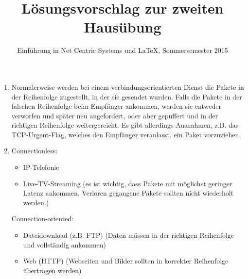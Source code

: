\documentclass[a4paper,
			llpt,
			solution,
			accentcolor=tud2d,
			colorbacktitle
			]
			{tudexercise}
\title{Lösungsvorschlag zur zweiten Hausübung}
\subtitle{Einführung in Net Centric Systems und \LaTeX, Sommersemester 2015}
\begin{document}
\maketitle

\setcounter{section}{2}
\subsection{}

\begin{enumerate}

\item
Normalerweise werden bei einem verbindungsorientierten Dienst die Pakete in der Reihenfolge zugestellt, in der sie gesendet wurden. Falls die Pakete in der falschen Reihenfolge beim Empfänger ankommen, werden sie entweder verworfen und später neu angefordert, oder aber gepuffert und in der richtigen Reihenfolge weitergereicht.
Es gibt allerdings Ausnahmen, z.B. das TCP-Urgent-Flag, welches den Empfänger veranlasst, ein Paket vorzuziehen.

\item
Connectionless:
\begin{itemize}
\item IP-Telefonie
\item Live-TV-Streaming
(es ist wichtig, dass Pakete mit möglichst geringer Latenz ankommen. Verloren gegangene Pakete sollten nicht wiederholt werden.)
\end{itemize}
Connection-oriented:
\begin{itemize}
\item Dateidownload (z.B. FTP)
(Daten müssen in der richtigen Reihenfolge und vollständig ankommen)
\item Web (HTTP)
(Webseiten und Bilder sollten in korrekter Reihenfolge übertragen werden)
\end{itemize}
\end{enumerate}


\subsection{}

\end{document}
